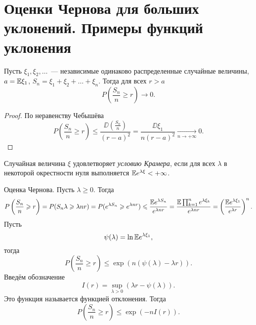 \section{Оценки Чернова для больших уклонений. Примеры функций уклонения}

\begin{theorem} Пусть
    $\xi_1, \xi_2, \ldots$~--- независимые одинаково распределенные случайные величины,
    $a = \mathbb{E}  \xi_1$, $S_n = \xi_1 + \xi_2 + \ldots + \xi_n$. Тогда для всех $ r > a $ $$
    P\left(\frac{S_n}{n} \ge r\right) \to 0.$$
\end{theorem}

\begin{proof}
По неравенству Чебышёва
    $$P\left(\frac{S_n}{n} \ge r\right) \le \frac{\DD\left(\tfrac{S_n}{n}\right)}{(r - a)^2} = \frac{\DD \xi_1}{n(r-a)^2} \underset{n \to +\infty}{\to} 0 .$$
\end{proof}

\begin{definition}
    Случайная величина $\xi$ удовлетворяет \textit{условию Крамера}, если для всех $\lambda$ в некоторой окрестности нуля выполняется
    $\mathbb{E}  e^{\lambda \xi} < +\infty$.
\end{definition}

Оценка Чернова. Пусть $\lambda \ge 0$. Тогда
    $$P\left(\frac{S_n}{n} \geqslant r\right) = P(S_n \lambda \geqslant \lambda n r) = P(e^{\lambda S_n} \geqslant e^{\lambda n r}) \leqslant
    \frac{\mathbb{E}  e^{\lambda S_n}}{e^{\lambda n r}} = \frac{\mathbb{E}  \prod_{k = 1}^{n} e^{\lambda \xi_k}}{e^{\lambda n r}} = \left ( \frac{\mathbb{E}  e^{\lambda \xi_1}}{e^{\lambda r}} \right )^n.$$
    Пусть 
    $$\psi(\lambda) = \ln \mathbb{E}  e^{\lambda \xi_1},$$
    тогда 
    $$P\left(\frac{S_n}{n} \ge r\right) \le \exp(n (\psi(\lambda) - \lambda r)).$$
    Введём обозначение
    $$I(r) = \sup \limits_{\lambda > 0} (\lambda r - \psi(\lambda)).$$ Это функция называется функцией отклонения. Тогда 
    $$P\left(\frac{S_n}{n} \ge r\right) \le \exp(-nI(r)).$$


